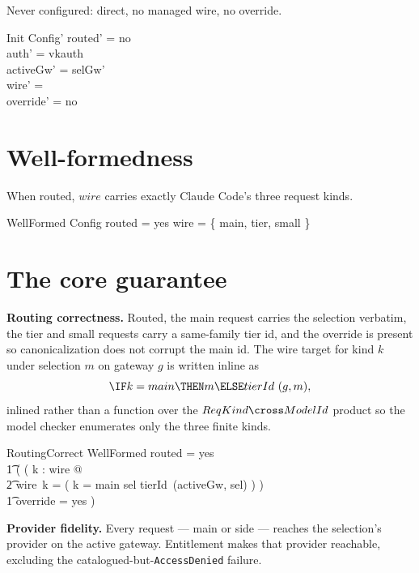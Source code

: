 \documentclass{article}
\begin{document}
Never configured: direct, no managed wire, no override.

\begin{schema}{Init}
  Config'
\where
  routed' = no \\
  auth' = vkauth \\
  activeGw' = selGw' \\
  wire' = \emptyset \\
  override' = no
\end{schema}

\section{Well-formedness}

When routed, $wire$ carries exactly Claude Code's three request kinds.

\begin{schema}{WellFormed}
  Config
\where
  routed = yes \implies \dom wire = \{ main, tier, small \}
\end{schema}

\section{The core guarantee}

\textbf{Routing correctness.} Routed, the main request carries the selection
verbatim, the tier and small requests carry a same-family tier id, and the
override is present so canonicalization does not corrupt the main id. The wire
target for kind $k$ under selection $m$ on gateway $g$ is written inline as
\[ \IF k = main \THEN m \ELSE tierId~(g, m), \]
inlined rather than a function over the $ReqKind \cross ModelId$ product so the
model checker enumerates only the three finite kinds.

\begin{schema}{RoutingCorrect}
  WellFormed
\where
  routed = yes \implies \\
  \t1 ( ( \forall k : \dom wire @ \\
  \t2     wire~k = ( \IF k = main \THEN sel \ELSE tierId~(activeGw, sel) ) ) \land \\
  \t1   override = yes )
\end{schema}

\textbf{Provider fidelity.} Every request --- main or side --- reaches the
selection's provider on the active gateway. Entitlement makes that provider
reachable, excluding the catalogued-but-\texttt{AccessDenied} failure.
\end{document}
